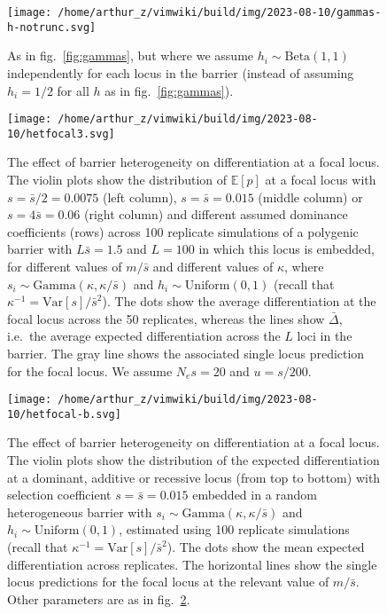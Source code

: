 \documentclass[
  11pt,
]{article}
\begin{document}
\begin{figure}
\hypertarget{fig:gammash}{%
\centering
\texttt{[image: /home/arthur\_z/vimwiki/build/img/2023-08-10/gammas-h-notrunc.svg]}
\caption{As in fig.~\ref{fig:gammas}, but where we assume
\(h_i \sim \mathrm{Beta}(1,1)\) independently for each locus in the
barrier (instead of assuming \(h_i = 1/2\) for all \(h\) as in
fig.~\ref{fig:gammas}).}\label{fig:gammash}
}
\end{figure}

\begin{figure}
\hypertarget{fig:hetfocal}{%
\centering
\texttt{[image: /home/arthur\_z/vimwiki/build/img/2023-08-10/hetfocal3.svg]}
\caption{The effect of barrier heterogeneity on differentiation at a
focal locus. The violin plots show the distribution of \(\mathbb{E}[p]\)
at a focal locus with \(s = \bar{s}/2 = 0.0075\) (left column),
\(s=\bar{s}=0.015\) (middle column) or \(s=4\bar{s}=0.06\) (right
column) and different assumed dominance coefficients (rows) across 100
replicate simulations of a polygenic barrier with \(L\bar{s} = 1.5\) and
\(L=100\) in which this locus is embedded, for different values of
\(m/\bar{s}\) and different values of \(\kappa\), where
\(s_i \sim \mathrm{Gamma}(\kappa, \kappa/\bar{s})\) and
\(h_i \sim \mathrm{Uniform}(0,1)\) (recall that
\(\kappa^{-1} = \mathrm{Var}[s]/\bar{s}^2\)). The dots show the average
differentiation at the focal locus across the 50 replicates, whereas the
lines show \(\bar{\Delta}\), i.e.~the average expected differentiation
across the \(L\) loci in the barrier. The gray line shows the associated
single locus prediction for the focal locus. We assume \(N_es=20\) and
\(u=s/200\).}\label{fig:hetfocal}
}
\end{figure}

\begin{figure}
\hypertarget{fig:hetfocalb}{%
\centering
\texttt{[image: /home/arthur\_z/vimwiki/build/img/2023-08-10/hetfocal-b.svg]}
\caption{The effect of barrier heterogeneity on differentiation at a
focal locus. The violin plots show the distribution of the expected
differentiation at a dominant, additive or recessive locus (from top to
bottom) with selection coefficient \(s=\bar{s}=0.015\) embedded in a
random heterogeneous barrier with
\(s_i \sim \mathrm{Gamma}(\kappa, \kappa/\bar{s})\) and
\(h_i \sim \mathrm{Uniform}(0,1)\), estimated using 100 replicate
simulations (recall that \(\kappa^{-1} = \mathrm{Var}[s]/\bar{s}^2\)).
The dots show the mean expected differentiation across replicates. The
horizontal lines show the single locus predictions for the focal locus
at the relevant value of \(m/\bar{s}\). Other parameters are as in
fig.~\ref{fig:hetfocal}.}\label{fig:hetfocalb}
}
\end{figure}
\end{document}
